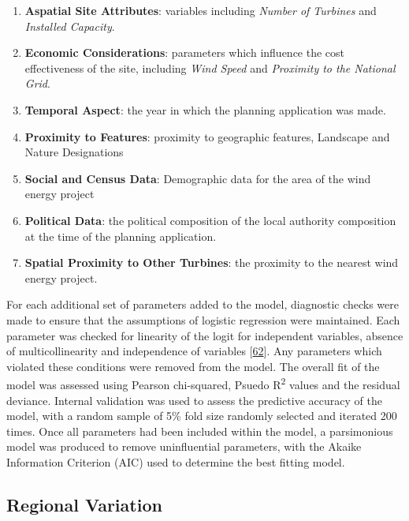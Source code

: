 \documentclass[a4paper,]{article}
\providecommand{\tightlist}{%
  \setlength{\itemsep}{0pt}\setlength{\parskip}{0pt}}
\theoremstyle{definition}
\theoremstyle{definition}
\theoremstyle{definition}
\theoremstyle{remark}
\begin{document}
\begin{enumerate}
\def\labelenumi{\arabic{enumi}.}
\tightlist
\item
  \textbf{Aspatial Site Attributes}: variables including \emph{Number of
  Turbines} and \emph{Installed Capacity}.
\item
  \textbf{Economic Considerations}: parameters which influence the cost
  effectiveness of the site, including \emph{Wind Speed} and
  \emph{Proximity to the National Grid}.
\item
  \textbf{Temporal Aspect}: the year in which the planning application
  was made.
\item
  \textbf{Proximity to Features}: proximity to geographic features,
  Landscape and Nature Designations
\item
  \textbf{Social and Census Data}: Demographic data for the area of the
  wind energy project
\item
  \textbf{Political Data}: the political composition of the local
  authority composition at the time of the planning application.
\item
  \textbf{Spatial Proximity to Other Turbines}: the proximity to the
  nearest wind energy project.
\end{enumerate}

For each additional set of parameters added to the model, diagnostic
checks were made to ensure that the assumptions of logistic regression
were maintained. Each parameter was checked for linearity of the logit
for independent variables, absence of multicollinearity and independence
of variables {[}\protect\hyperlink{ref-Harrell2001}{62}{]}. Any
parameters which violated these conditions were removed from the model.
The overall fit of the model was assessed using Pearson chi-squared,
Psuedo R\textsuperscript{2} values and the residual deviance. Internal
validation was used to assess the predictive accuracy of the model, with
a random sample of 5\% fold size randomly selected and iterated 200
times. Once all parameters had been included within the model, a
parsimonious model was produced to remove uninfluential parameters, with
the Akaike Information Criterion (AIC) used to determine the best
fitting model.

\subsection{Regional Variation}\label{regional-variation}
\end{document}
